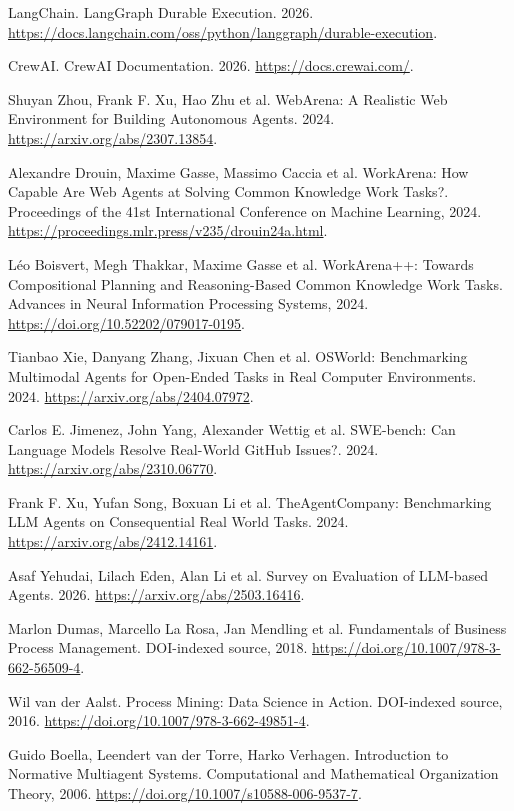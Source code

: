  {LangChain}. {LangGraph} Durable Execution. 2026. \url{https://docs.langchain.com/oss/python/langgraph/durable-execution}.

 {CrewAI}. {CrewAI} Documentation. 2026. \url{https://docs.crewai.com/}.

 Shuyan Zhou, Frank F. Xu, Hao Zhu et al. {WebArena}: A Realistic Web Environment for Building Autonomous Agents. 2024. \url{https://arxiv.org/abs/2307.13854}.

 Alexandre Drouin, Maxime Gasse, Massimo Caccia et al. {WorkArena}: How Capable Are Web Agents at Solving Common Knowledge Work Tasks?. Proceedings of the 41st International Conference on Machine Learning, 2024. \url{https://proceedings.mlr.press/v235/drouin24a.html}.

 L{\'e}o Boisvert, Megh Thakkar, Maxime Gasse et al. {WorkArena++}: Towards Compositional Planning and Reasoning-Based Common Knowledge Work Tasks. Advances in Neural Information Processing Systems, 2024. \url{https://doi.org/10.52202/079017-0195}.

 Tianbao Xie, Danyang Zhang, Jixuan Chen et al. {OSWorld}: Benchmarking Multimodal Agents for Open-Ended Tasks in Real Computer Environments. 2024. \url{https://arxiv.org/abs/2404.07972}.

 Carlos E. Jimenez, John Yang, Alexander Wettig et al. {SWE-bench}: Can Language Models Resolve Real-World {GitHub} Issues?. 2024. \url{https://arxiv.org/abs/2310.06770}.

 Frank F. Xu, Yufan Song, Boxuan Li et al. {TheAgentCompany}: Benchmarking {LLM} Agents on Consequential Real World Tasks. 2024. \url{https://arxiv.org/abs/2412.14161}.

 Asaf Yehudai, Lilach Eden, Alan Li et al. Survey on Evaluation of {LLM}-based Agents. 2026. \url{https://arxiv.org/abs/2503.16416}.

 Marlon Dumas, Marcello La Rosa, Jan Mendling et al. Fundamentals of Business Process Management. DOI-indexed source, 2018. \url{https://doi.org/10.1007/978-3-662-56509-4}.

 Wil van der Aalst. Process Mining: Data Science in Action. DOI-indexed source, 2016. \url{https://doi.org/10.1007/978-3-662-49851-4}.

 Guido Boella, Leendert van der Torre, Harko Verhagen. Introduction to Normative Multiagent Systems. Computational and Mathematical Organization Theory, 2006. \url{https://doi.org/10.1007/s10588-006-9537-7}.

